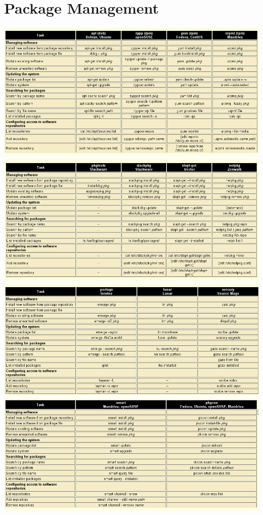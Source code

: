 \chapter{Package Management}
\begin{center}
\includegraphics[scale=0.5]{src/package_managers_1.png}
\includegraphics[scale=0.5]{src/package_managers_2.png}
\includegraphics[scale=0.5]{src/package_managers_3.png}
\includegraphics[scale=0.5]{src/package_managers_4.png}

\end{center}
